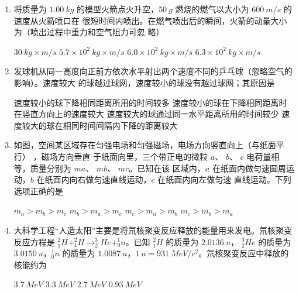 \begin{enumerate}
\renewcommand{\labelenumi}{\arabic{enumi}.}
\item
将质量为 $ 1.00 \ kg $ 的模型火箭点火升空，$ 50 \ g $ 燃烧的燃气以大小为 $ 600 \ m/s $ 的速度从火箭喷口在
很短时间内喷出。在燃气喷出后的瞬间，火箭的动量大小为（喷出过程中重力和空气阻力可忽
略）  

\fourchoices
{$ 30 \ kg \times m/s $}
{$ 5.7 \times 10^{2} \ kg \times m/s $}
{$ 6.0 \times 10^{2} \ kg \times m/s $}
{$ 6.3 \times 10^{2} \ kg \times m/s $}



\item
发球机从同一高度向正前方依次水平射出两个速度不同的乒乓球（忽略空气的影响）。速度较大
的球越过球网，速度较小的球没有越过球网；其原因是  

\fourchoices
{速度较小的球下降相同距离所用的时间较多}
{速度较小的球在下降相同距离时在竖直方向上的速度较大}
{速度较大的球通过同一水平距离所用的时间较少}
{速度较大的球在相同时间间隔内下降的距离较大}



\item
如图，空间某区域存在匀强电场和匀强磁场，电场方向竖直向上（与纸面平行）
，磁场方向垂直
于纸面向里，三个带正电的微粒 $ a $、 $ b $、 $ c $ 电荷量相等，质量分别为 $ ma $、 $ mb $、 $ mc $。已知在该
区域内，$ a $ 在纸面内做匀速圆周运动，$ b $ 在纸面内向右做匀速直线运动，$ c $ 在纸面内向左做匀速
直线运动。下列选项正确的是  
\begin{figure}[h!]
\centering

\end{figure}


\fourchoices
{$m_{a}>m_{b}>m_{c}$}
{$m_{b}>m_{a}>m_{c}$}
{$ m_{c}>m_{a}>m_{b}$}
{$m_{c}>m_{b}>m_{a}$}



\item 
大科学工程“人造太阳”主要是将氘核聚变反应释放的能量用来发电。氘核聚变反应方程是
$ ^2_1H+^2_1H \rightarrow ^3_2He+ ^1_0n $。已知 $ ^2_1H $ 的质量为 $ 2.0136 \ u $， $ ^3_2He $ 的质量为 $ 3.0150 \ u $，$ ^1_0 n $ 的质量为 $ 1.0087 \ u $，$ 1 \ u=931 \ MeV/c^{2} $。氘核聚变反应中释放的核能约为  

\fourchoices
{$ 3.7 \ MeV $}
{$ 3.3 \ MeV $}
{$ 2.7 \ MeV $}
{$ 0.93 \ MeV $}



\end{enumerate}

